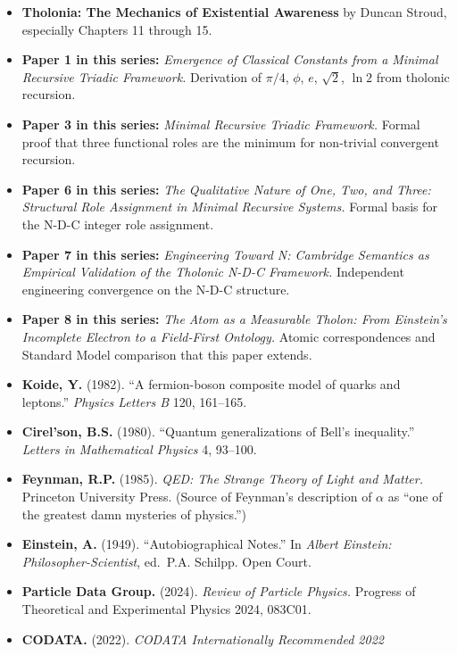 \documentclass[12pt]{article}
\providecommand{\tightlist}{%
  \setlength{\itemsep}{0pt}\setlength{\parskip}{0pt}}
\begin{document}
\begin{itemize}
\tightlist
\item
  \textbf{Tholonia: The Mechanics of Existential Awareness} by Duncan
  Stroud, especially Chapters 11 through 15.
\item
  \textbf{Paper 1 in this series:} \emph{Emergence of Classical
  Constants from a Minimal Recursive Triadic Framework.} Derivation of
  \(\pi/4\), \(\phi\), \(e\), \(\sqrt{2}\), \(\ln 2\) from tholonic
  recursion.
\item
  \textbf{Paper 3 in this series:} \emph{Minimal Recursive Triadic
  Framework.} Formal proof that three functional roles are the minimum
  for non-trivial convergent recursion.
\item
  \textbf{Paper 6 in this series:} \emph{The Qualitative Nature of One,
  Two, and Three: Structural Role Assignment in Minimal Recursive
  Systems.} Formal basis for the N-D-C integer role assignment.
\item
  \textbf{Paper 7 in this series:} \emph{Engineering Toward N: Cambridge
  Semantics as Empirical Validation of the Tholonic N-D-C Framework.}
  Independent engineering convergence on the N-D-C structure.
\item
  \textbf{Paper 8 in this series:} \emph{The Atom as a Measurable
  Tholon: From Einstein's Incomplete Electron to a Field-First
  Ontology.} Atomic correspondences and Standard Model comparison that
  this paper extends.
\item
  \textbf{Koide, Y.} (1982). ``A fermion-boson composite model of quarks
  and leptons.'' \emph{Physics Letters B} 120, 161--165.
\item
  \textbf{Cirel'son, B.S.} (1980). ``Quantum generalizations of Bell's
  inequality.'' \emph{Letters in Mathematical Physics} 4, 93--100.
\item
  \textbf{Feynman, R.P.} (1985). \emph{QED: The Strange Theory of Light
  and Matter.} Princeton University Press. (Source of Feynman's
  description of \(\alpha\) as ``one of the greatest damn mysteries of
  physics.'')
\item
  \textbf{Einstein, A.} (1949). ``Autobiographical Notes.'' In
  \emph{Albert Einstein: Philosopher-Scientist}, ed.~P.A. Schilpp. Open
  Court.
\item
  \textbf{Particle Data Group.} (2024). \emph{Review of Particle
  Physics.} Progress of Theoretical and Experimental Physics 2024,
  083C01.
\item
  \textbf{CODATA.} (2022). \emph{CODATA Internationally Recommended 2022
}
\end{itemize}
\end{document}
